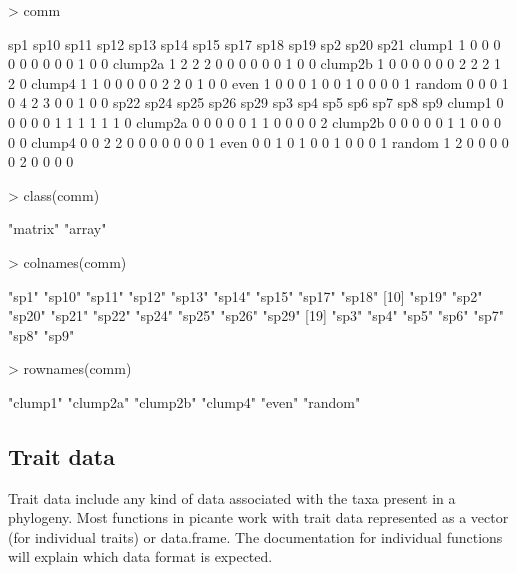 \documentclass[12pt]{article}
\begin{document}
\begin{Schunk}
\begin{Sinput}
> comm
\end{Sinput}
\begin{Soutput}
        sp1 sp10 sp11 sp12 sp13 sp14 sp15 sp17 sp18 sp19 sp2 sp20 sp21
clump1    1    0    0    0    0    0    0    0    0    0   1    0    0
clump2a   1    2    2    2    0    0    0    0    0    0   1    0    0
clump2b   1    0    0    0    0    0    0    2    2    2   1    2    0
clump4    1    1    0    0    0    0    0    2    2    0   1    0    0
even      1    0    0    0    1    0    0    1    0    0   0    0    1
random    0    0    0    1    0    4    2    3    0    0   1    0    0
        sp22 sp24 sp25 sp26 sp29 sp3 sp4 sp5 sp6 sp7 sp8 sp9
clump1     0    0    0    0    0   1   1   1   1   1   1   0
clump2a    0    0    0    0    0   1   1   0   0   0   0   2
clump2b    0    0    0    0    0   1   1   0   0   0   0   0
clump4     0    0    2    2    0   0   0   0   0   0   0   1
even       0    0    1    0    1   0   0   1   0   0   0   1
random     1    2    0    0    0   0   0   2   0   0   0   0
\end{Soutput}
\begin{Sinput}
> class(comm)
\end{Sinput}
\begin{Soutput}
[1] "matrix" "array" 
\end{Soutput}
\begin{Sinput}
> colnames(comm)
\end{Sinput}
\begin{Soutput}
 [1] "sp1"  "sp10" "sp11" "sp12" "sp13" "sp14" "sp15" "sp17" "sp18"
[10] "sp19" "sp2"  "sp20" "sp21" "sp22" "sp24" "sp25" "sp26" "sp29"
[19] "sp3"  "sp4"  "sp5"  "sp6"  "sp7"  "sp8"  "sp9" 
\end{Soutput}
\begin{Sinput}
> rownames(comm)
\end{Sinput}
\begin{Soutput}
[1] "clump1"  "clump2a" "clump2b" "clump4"  "even"    "random" 
\end{Soutput}
\end{Schunk}

\subsection{Trait data}

Trait data include any kind of data associated with the taxa present in a phylogeny. Most functions in picante work with trait data represented as a vector (for individual traits) or data.frame. The documentation for individual functions will explain which data format is expected.
\end{document}
